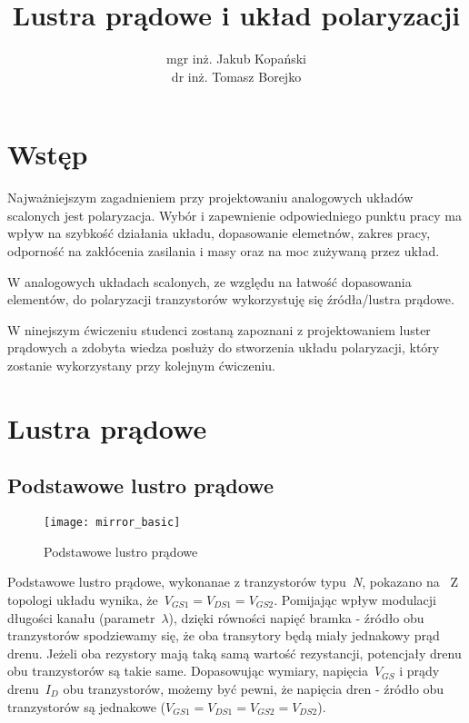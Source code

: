 \documentclass[twoside,pl,final]{labman}
\title{Lustra prądowe i układ polaryzacji}
\author{mgr inż. Jakub Kopański\\
dr inż. Tomasz Borejko}
\begin{document}
\maketitle
\tableofcontents
\clearpage
\listoffigures
\clearpage
\listoftables
\clearpage

\chapter{Wstęp}
\label{intro}
Najważniejszym zagadnieniem przy projektowaniu
analogowych układów scalonych jest polaryzacja.
Wybór i zapewnienie odpowiedniego punktu pracy
ma wpływ na szybkość działania układu,
dopasowanie elemetnów, zakres pracy,
odporność na zakłócenia zasilania i masy
oraz na moc zużywaną przez układ.

W analogowych układach scalonych,
ze względu na łatwość dopasowania elementów,
do polaryzacji tranzystorów wykorzystuję się źródła/lustra prądowe.

W ninejszym ćwiczeniu studenci zostaną zapoznani
z projektowaniem luster prądowych
a zdobyta wiedza posłuży do stworzenia układu polaryzacji,
który zostanie wykorzystany przy kolejnym ćwiczeniu.

\chapter{Lustra prądowe}
\label{mirror}

\section{Podstawowe lustro prądowe}
\label{mirror:basic}
\begin{figure}[!htbp]
  \centering
  \texttt{[image: mirror\_basic]}
  \caption{Podstawowe lustro prądowe}
  \label{fig:mirror:basic}
\end{figure}

Podstawowe lustro prądowe,
wykonanae z tranzystorów typu~\emph{N},
pokazano na~
Z topologi układu wynika, że~$V_{GS1} = V_{DS1} = V_{GS2}$.
Pomijając wpływ modulacji długości kanału (parametr~$\lambda$),
dzięki równości napięć bramka - źródło obu tranzystorów spodziewamy się,
że oba transytory będą miały jednakowy prąd drenu.
Jeżeli oba rezystory mają taką samą wartość rezystancji,
potencjały drenu obu tranzystorów są takie same.
Dopasowując wymiary, napięcia~$V_{GS}$ i prądy drenu~$I_D$ obu tranzystorów,
możemy być pewni, że napięcia dren - źródło obu tranzystorów są jednakowe
($V_{GS1} = V_{DS1} = V_{GS2} = V_{DS2}$).
\end{document}
